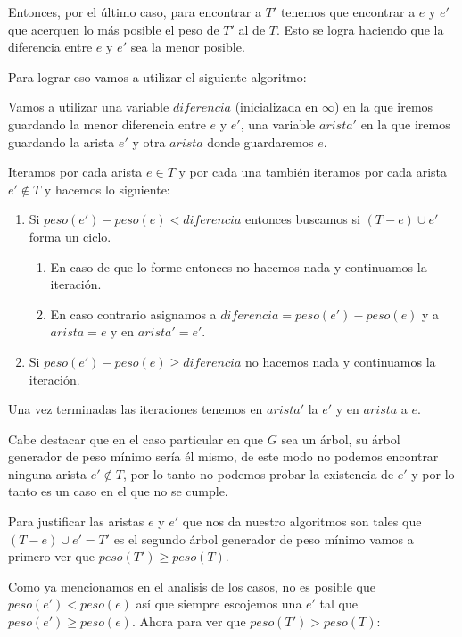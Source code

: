 \documentclass[11pt,letterpaper]{article}
\begin{document}
\begin{enumerate}[leftmargin=*]
    Entonces, por el último caso, para encontrar a $T'$ tenemos que encontrar a $e$ y $e'$ que acerquen lo más posible el peso de $T'$ al de $T$.
    Esto se logra haciendo que la diferencia entre $e$ y $e'$ sea la menor posible.

    Para lograr eso vamos a utilizar el siguiente algoritmo:

    Vamos a utilizar una variable $diferencia$ (inicializada en $\infty$) en la que iremos guardando la menor diferencia entre $e$ y $e'$, una variable $arista'$ en la que iremos guardando la arista $e'$ y otra $arista$ donde guardaremos $e$.

    Iteramos por cada arista $e \in T$ y por cada una también iteramos por cada arista $e' \notin T$ y hacemos lo siguiente:

    \begin{enumerate}
      \item Si $peso(e') - peso(e) < diferencia$ entonces buscamos si $(T - e) \cup {e'}$ forma un ciclo.
      \begin{enumerate}
        \item En caso de que lo forme entonces no hacemos nada y continuamos la iteración.
        \item En caso contrario asignamos a $diferencia = peso(e') - peso(e)$ y a $arista = e$ y en $arista' = e'$.
      \end{enumerate}
      \item Si $peso(e') - peso(e) \geq diferencia$ no hacemos nada y continuamos la iteración.
    \end{enumerate}

    Una vez terminadas las iteraciones tenemos en $arista'$ la $e'$ y en $arista$ a $e$.

    Cabe destacar que en el caso particular en que $G$ sea un árbol, su árbol generador de peso mínimo sería él mismo, de este modo no podemos encontrar ninguna arista $e' \notin T$, por lo tanto no podemos probar la existencia de $e'$ y por lo tanto es un caso en el que no se cumple.

    Para justificar las aristas $e$ y $e'$ que nos da nuestro algoritmos son tales que $(T - e) \cup {e'} = T'$ es el segundo árbol generador de peso mínimo vamos a primero ver que $peso(T') \geq peso(T)$.

    Como ya mencionamos en el analisis de los casos, no es posible que $peso(e') < peso(e)$ así que siempre escojemos una $e'$ tal que $peso(e') \geq peso(e)$.
    Ahora para ver que $peso(T') > peso(T)$: 


\end{enumerate}
\end{document}
